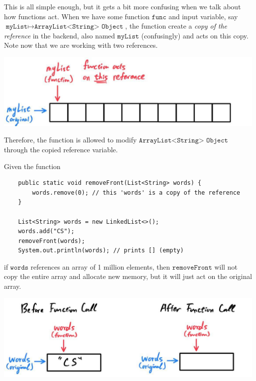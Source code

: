 \documentclass{article}
\begin{document}
    This is all simple enough, but it gets a bit more confusing when we talk about how functions act. When we have some function $\texttt{func}$ and input variable, say $\texttt{myList} \mapsto \texttt{ArrayList<String> Object}$, the function create a \textit{copy of the reference} in the backend, also named $\texttt{myList}$ (confusingly) and acts on this copy. Note now that we are working with two references. 
    \begin{center}
        \includegraphics[scale=0.3]{img/functions_on_references.jpg}
    \end{center}
    Therefore, the function is allowed to modify $\texttt{ArrayList<String> Object}$ through the copied reference variable. 

    \begin{example}
    Given the function 
    \begin{lstlisting}
    public static void removeFront(List<String> words) {
        words.remove(0); // this 'words' is a copy of the reference 
    }

    List<String> words = new LinkedList<>(); 
    words.add("CS"); 
    removeFront(words); 
    System.out.println(words); // prints [] (empty)
    \end{lstlisting}
    if $\texttt{words}$ references an array of 1 million elements, then $\texttt{removeFront}$ will not copy the entire array and allocate new memory, but it will just act on the original array. 
    \begin{center}
        \includegraphics[scale=0.3]{img/func_ref_example1.jpg}
    \end{center}
    \end{example}
\end{document}
